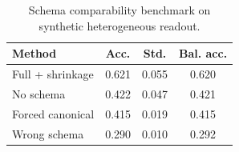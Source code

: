 \begin{table}[t]
\centering
\caption{Schema comparability benchmark on synthetic heterogeneous readout.}
\label{tab:schema}
\begin{tabular}{lccc}
\toprule
Method & Acc. & Std. & Bal. acc. \\
\midrule
Full + shrinkage & 0.621 & 0.055 & 0.620 \\
No schema & 0.422 & 0.047 & 0.421 \\
Forced canonical & 0.415 & 0.019 & 0.415 \\
Wrong schema & 0.290 & 0.010 & 0.292 \\
\bottomrule
\end{tabular}
\end{table}
